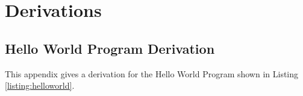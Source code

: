 \documentclass[12pt,twoside]{report}
\begin{document}








\section{Derivations}
\subsection{Hello World Program Derivation}
\label{appendix:helloworldderivation}
This appendix gives a derivation for the Hello World Program shown in Listing \ref{listing:helloworld}.
\end{document}
